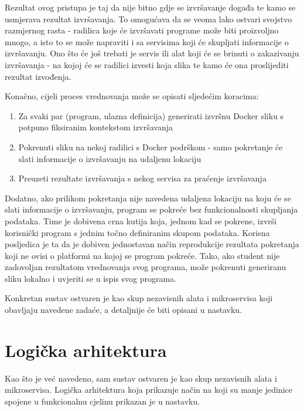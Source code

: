 \documentclass[times, utf8, zavrsni]{fer}
\begin{document}
Rezultat ovog pristupa je taj da nije bitno gdje se izvršavanje događa te kamo se usmjerava rezultat izvršavanja. To omogućava da se veoma lako ostvari svojstvo razmjernog rasta - radilica koje će izvršavati programe može biti proizvoljno mnogo, a isto to se može napraviti i sa servisima koji će skupljati informacije o izvršavanju. Ono što će još trebati je servis ili alat koji će se brinuti o zakazivanju izvršavanja - na kojoj će se radilici izvesti koja slika te kamo će ona proslijediti rezultat izvođenja.

Konačno, cijeli proces vrednovanja može se opisati sljedećim koracima:

\begin{enumerate}
\item Za svaki par (program, ulazna definicija) generirati izvršnu Docker sliku s potpuno fiksiranim kontekstom izvršavanja
\item Pokrenuti sliku na nekoj radilici s Docker podrškom - samo pokretanje će slati informacije o izvršavanju na udaljenu lokaciju
\item Preuzeti rezultate izvršavanja s nekog servisa za praćenje izvršavanja
\end{enumerate}

Dodatno, ako prilikom pokretanja nije navedena udaljena lokaciju na koju će se slati informacije o izvršavanju, program se pokreće bez funkcionalnosti skupljanja podataka. Time je dobivena crna kutija koja, jednom kad se pokrene, izvrši korisnički program s jednim točno definiranim skupom podataka. Korisna posljedica je ta da je dobiven jednostavan način reprodukcije rezultata pokretanja koji ne ovisi o platformi na kojoj se program pokreće. Tako, ako student nije zadovoljan rezultatom vrednovanja svog programa, može pokrenuti generiranu sliku lokalno i uvjeriti se u ispis svog programa.

Konkretan sustav ostvaren je kao skup nezavisnih alata i mikroservisa koji obavljaju navedene zadaće, a detaljnije će biti opisani u nastavku.

\section{Logička arhitektura}

Kao što je već navedeno, sam sustav ostvaren je kao skup nezavisnih alata i mikroservisa. Logička arhitektura koja prikazuje način na koji su manje jedinice spojene u funkcionalnu cjelinu prikazan je u nastavku.
\end{document}
